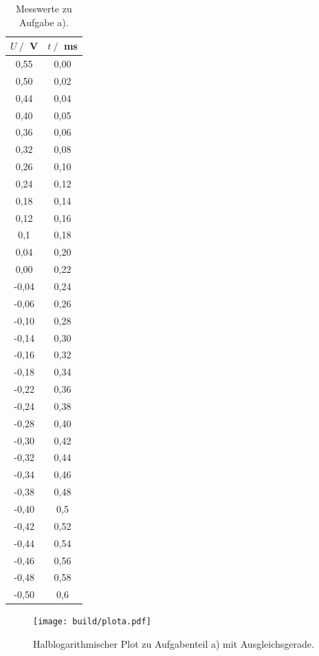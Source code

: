 \begin{table}[H]
    \centering
    \caption{Messwerte zu Aufgabe a).}
    \label{tab:wertea}
    \begin{tabular}{c c}
        \toprule
        $U \:/\:$ V & $t \:/\:$ ms \\
        \midrule
        0,55 & 0,00 \\
        0,50 & 0,02 \\
        0,44 & 0,04 \\
        0,40 & 0,05 \\
        0,36 & 0,06 \\
        0,32 & 0,08 \\
        0,26 & 0,10 \\
        0,24 & 0,12 \\
        0,18 & 0,14 \\
        0,12 & 0,16 \\
        0,1 & 0,18 \\
        0,04 & 0,20 \\
        0,00 & 0,22 \\
        -0,04 & 0,24 \\
        -0,06 & 0,26 \\
        -0,10 & 0,28 \\
        -0,14 & 0,30 \\
        -0,16 & 0,32 \\
        -0,18 & 0,34 \\
        -0,22 & 0,36 \\
        -0,24 & 0,38 \\
        -0,28 & 0,40 \\
        -0,30 & 0,42 \\
        -0,32 & 0,44 \\
        -0,34 & 0,46 \\
        -0,38 & 0,48 \\
        -0,40 & 0,5 \\
        -0,42 & 0,52 \\
        -0,44 & 0,54 \\
        -0,46 & 0,56 \\
        -0,48 & 0,58 \\
        -0,50 & 0,6 \\
        \bottomrule
    \end{tabular}
\end{table}

\begin{figure}[H]
    \centering
    \texttt{[image: build/plota.pdf]}
    \caption{Halblogarithmischer Plot zu Aufgabenteil a) mit Ausgleichsgerade.}
    \label{fig:plot_a}
  \end{figure}

